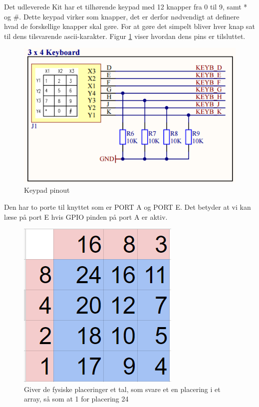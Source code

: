 Det udleverede Kit har et tilhørende keypad med 12 knapper fra 0 til 9, samt * og \#. Dette keypad virker som knapper, det er derfor nødvendigt at definere hvad de forskellige knapper skal gøre. For at gøre det simpelt bliver hver knap sat til dens tilsvarende ascii-karakter. Figur \ref{fig:Keypadpins} viser hvordan dens pins er tilsluttet.
\begin{figure}[ht]
	\begin{center}
		\includegraphics[scale=0.7]{Billeder/Keypadpins.PNG}
	\end{center}
\caption{Keypad pinout}
\label{fig:Keypadpins}
\end{figure}
Den har to porte til knyttet som er PORT A og PORT E. Det betyder at vi kan læse på port E hvis GPIO pinden på port A er aktiv.
\begin{figure}[ht]
	\begin{center}
		\includegraphics[scale=0.7]{Billeder/Keypad.PNG}
	\end{center}
\caption{Giver de fysiske placeringer et tal, som svare et en placering i et array, så som at 1 for placering 24}
\label{fig:Keypad}
\end{figure}


